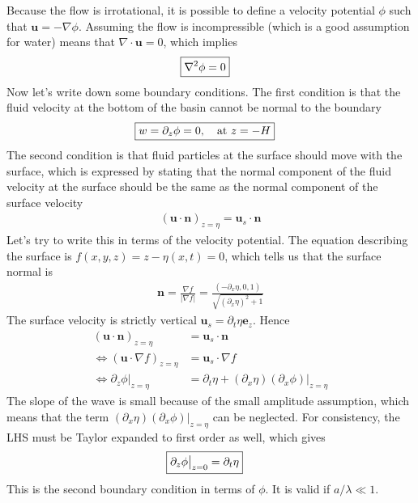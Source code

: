 \documentclass[a4paper, 12pt]{article}
\numberwithin{equation}{subsubsection}
\begin{document}
Because the flow is irrotational, it is possible to define a velocity potential $\phi$ such that $\mathbf{u} = -\nabla \phi$. Assuming the flow is incompressible (which is a good assumption for water) means that $\nabla \cdot \mathbf{u} = 0$, which implies
\begin{align}
	\Aboxed{\nabla^2 \phi = 0} \label{eq:gravity_wave_b0}
\end{align}
Now let's write down some boundary conditions. The first condition is that the fluid velocity at the bottom of the basin cannot be normal to the boundary
\begin{align}
	\Aboxed{w = \partial_z \phi = 0, \quad \text{at $z = -H$}} \label{eq:gravity_wave_b1}
\end{align}
The second condition is that fluid particles at the surface should move with the surface, which is expressed by stating that the normal component of the fluid velocity at the surface should be the same as the normal component of the surface velocity
\begin{align}
	(\mathbf{u} \cdot \mathbf{n})_{z=\eta} = \mathbf{u}_s \cdot \mathbf{n}
\end{align}
Let's try to write this in terms of the velocity potential. The equation describing the surface is $f(x,y,z) = z - \eta(x,t) = 0$, which tells us that the surface normal is
\begin{align}
	\mathbf{n} = \frac{\nabla f}{|\nabla f|} = \frac{\left( -\partial_x \eta, 0, 1 \right)}{\sqrt{(\partial_x \eta)^2 + 1}}
\end{align}
The surface velocity is strictly vertical $\mathbf{u}_s = \partial_t \eta \mathbf{e}_z$. Hence
\begin{align*}
	(\mathbf{u} \cdot \mathbf{n})_{z=\eta} &= \mathbf{u}_s \cdot \mathbf{n} \\
	\Leftrightarrow (\mathbf{u} \cdot \nabla f)_{z=\eta} &= \mathbf{u}_s \cdot \nabla f \\
	\Leftrightarrow \partial_z \phi \big|_{z = \eta} &= \partial_t \eta + (\partial_x \eta) (\partial_x \phi) \big|_{z=\eta}
\end{align*}
The slope of the wave is small because of the small amplitude assumption, which means that the term $(\partial_x \eta) (\partial_x \phi) \big|_{z=\eta}$ can be neglected. For consistency, the LHS must be Taylor expanded to first order as well, which gives
\begin{align}
	\Aboxed{\partial_z \phi \big|_{z = 0} = \partial_t \eta} \label{eq:gravity_wave_b2}
\end{align}
This is the second boundary condition in terms of $\phi$. It is valid if $a/\lambda \ll 1$.
\end{document}

